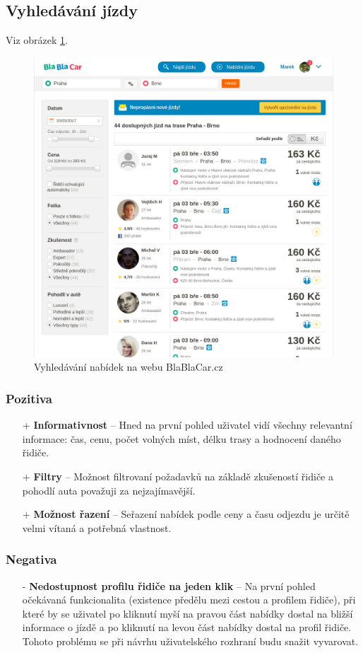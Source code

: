 \subsection{Vyhledávání jízdy}
Viz obrázek \ref{fig:blablacar:search}.
\begin{figure}[h]
    \centering
    \includegraphics[width=1.0\textwidth]{media/blablacar/search.png}
    \caption{Vyhledávání nabídek na webu BlaBlaCar.cz}
    \label{fig:blablacar:search}
\end{figure}
\subsubsection*{Pozitiva}
\begin{itemize}
    \item[+] \textbf{Informativnost} -- Hned na první pohled uživatel vidí všechny relevantní informace: čas, cenu, počet volných míst, délku trasy a hodnocení daného řidiče.
    \item[+] \textbf{Filtry} -- Možnost filtrovaní požadavků na základě zkušeností řidiče a pohodlí auta považuji za nejzajímavější.
    \item[+] \textbf{Možnost řazení} -- Seřazení nabídek podle ceny a času odjezdu je určitě velmi vítaná a potřebná vlastnost.
\end{itemize}
\subsubsection*{Negativa}
\begin{itemize}
    \item[-] \textbf{Nedostupnost profilu řidiče na jeden klik} -- Na první pohled očekávaná funkcionalita (existence předělu mezi cestou a profilem řidiče), při které by se uživatel po kliknutí myší na pravou část nabídky dostal na bližší informace o jízdě a po kliknutí na levou část nabídky dostal na profil řidiče. Tohoto problému se při návrhu uživatelského rozhraní budu snažit vyvarovat.
\end{itemize}


